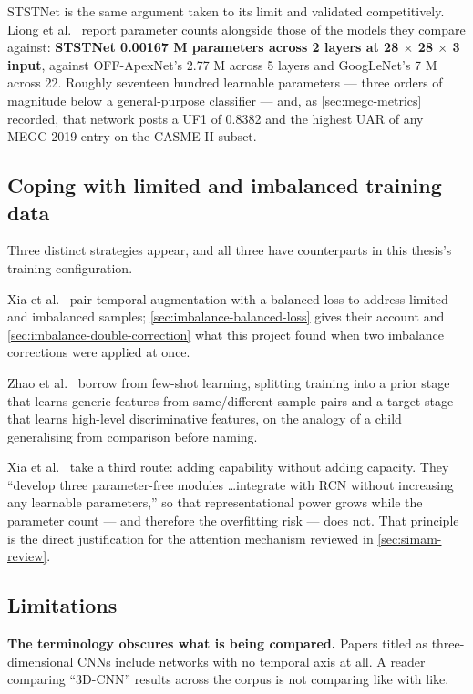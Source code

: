 STSTNet is the same argument taken to its limit and validated competitively. Liong et al.~\cite{liong2019b} report parameter counts alongside those of the models they compare against: \textbf{STSTNet 0.00167 M parameters across 2 layers at 28 $\times$ 28 $\times$ 3 input}, against OFF-ApexNet's 2.77 M across 5 layers and GoogLeNet's 7 M across 22. Roughly seventeen hundred learnable parameters --- three orders of magnitude below a general-purpose classifier --- and, as \autoref{sec:megc-metrics} recorded, that network posts a UF1 of 0.8382 and the highest UAR of any MEGC 2019 entry on the CASME II subset.

\subsection{Coping with limited and imbalanced training data}
\label{sec:cnn-limited-data}

Three distinct strategies appear, and all three have counterparts in this thesis's training configuration.

Xia et al.~\cite{xia2020a} pair temporal augmentation with a balanced loss to address limited and imbalanced samples; \autoref{sec:imbalance-balanced-loss} gives their account and \autoref{sec:imbalance-double-correction} what this project found when two imbalance corrections were applied at once.

Zhao et al.~\cite{zhaoS2021} borrow from few-shot learning, splitting training into a prior stage that learns generic features from same/different sample pairs and a target stage that learns high-level discriminative features, on the analogy of a child generalising from comparison before naming.

Xia et al.~\cite{xia2020b} take a third route: adding capability without adding capacity. They ``develop three parameter-free modules \ldots integrate with RCN without increasing any learnable parameters,'' so that representational power grows while the parameter count --- and therefore the overfitting risk --- does not. That principle is the direct justification for the attention mechanism reviewed in \autoref{sec:simam-review}.

\subsection{Limitations}
\label{sec:cnn-limitations}

\textbf{The terminology obscures what is being compared.} Papers titled as three-dimensional CNNs include networks with no temporal axis at all. A reader comparing ``3D-CNN'' results across the corpus is not comparing like with like.

